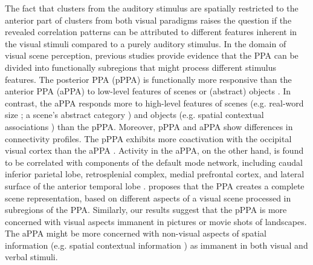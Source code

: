 \documentclass[english]{article}
\begin{document}
The fact that clusters from the auditory stimulus are spatially restricted to
the anterior part of clusters from both visual paradigms raises the question if
the revealed correlation patterns can be attributed to different features
inherent in the visual stimuli compared to a purely auditory stimulus.
In the domain of visual scene perception, previous studies provide evidence
that the PPA can be divided into functionally subregions that might process
different stimulus features.
The posterior PPA (pPPA) is functionally more responsive than the anterior PPA
(aPPA) to low-level features of scenes or (abstract) objects
\citep{baldassano2013differential, lescroart2019human, nasr2014thinking,
rajimehr2011parahippocampal}.
In contrast, the aPPA responds more to high-level features of scenes (e.g.
real-word size \citep{park2015parametric}; a scene's abstract category
\citep{marchette2015outside, watson2016patterns}) and objects (e.g. spatial
contextual associations \citep{aminoff2007parahippocampal, aminoff2013role})
than the pPPA.
Moreover, pPPA and aPPA show differences in connectivity profiles.
The pPPA exhibits more coactivation with the occipital visual cortex than the
aPPA \citep{baldassano2013differential, baldassano2016two}.
Activity in the aPPA, on the other hand, is found to be correlated with
components of the default mode network, including caudal inferior parietal lobe,
retrosplenial complex, medial prefrontal cortex, and lateral surface of
the anterior temporal lobe \citep{baldassano2013differential,
baldassano2016two}.
\cite{baldassano2013differential} proposes that the PPA creates a complete
scene representation, based on different aspects of a visual scene processed in
subregions of the PPA.
Similarly, our results suggest that the pPPA is more concerned with visual
aspects immanent in pictures or movie shots of landscapes.
The aPPA might be more concerned with non-visual aspects of spatial information
(e.g. spatial contextual information \citep{aminoff2007parahippocampal}) as
immanent in both visual and verbal stimuli.
\end{document}

